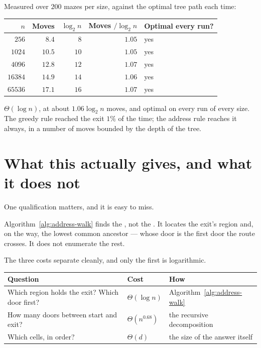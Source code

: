 \documentclass[11pt,a4paper]{article}
\begin{document}
Measured over $200$ mazes per size, against the optimal tree path each time:

\begin{center}
\begin{tabular}{@{}rrrrl@{}}
  \toprule
  $n$ & Moves & $\log_2 n$ & Moves $/\log_2 n$ & Optimal every run? \\
  \midrule
  $256$   & $8.4$  & $8$  & $1.05$ & yes \\
  $1024$  & $10.5$ & $10$ & $1.05$ & yes \\
  $4096$  & $12.8$ & $12$ & $1.07$ & yes \\
  $16384$ & $14.9$ & $14$ & $1.06$ & yes \\
  $65536$ & $17.1$ & $16$ & $1.07$ & yes \\
  \bottomrule
\end{tabular}
\end{center}

\begin{keypoint}
$\Theta(\log n)$, at about $1.06\log_2 n$ moves, and optimal on every run of
every size. The greedy rule reached the exit $1\%$ of the time; the address rule
reaches it always, in a number of moves bounded by the depth of the tree.
\end{keypoint}

\section{What this actually gives, and what it does not}

One qualification matters, and it is easy to miss.

\begin{keypoint}
Algorithm~\ref{alg:address-walk} finds the , not the
. It locates the exit's region and, on the way, the lowest common
ancestor --- whose door is the first door the route crosses. It does not
enumerate the rest.
\end{keypoint}

The three costs separate cleanly, and only the first is logarithmic.

\begin{center}
\begin{tabular}{@{}lll@{}}
  \toprule
  Question & Cost & How \\
  \midrule
  Which region holds the exit? Which door first? & $\Theta(\log n)$
    & Algorithm~\ref{alg:address-walk} \\
  How many doors between start and exit? & $\Theta(n^{0.68})$
    & the recursive decomposition \\
  Which cells, in order? & $\Theta(d)$
    & the size of the answer itself \\
  \bottomrule
\end{tabular}
\end{center}
\end{document}
